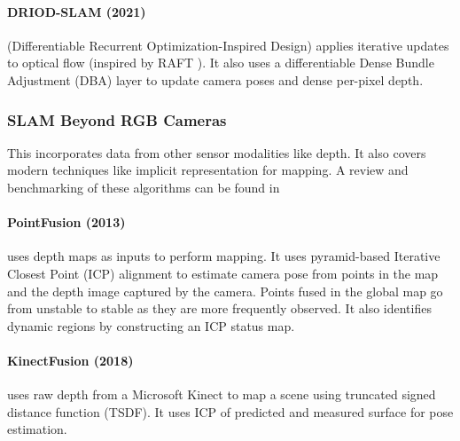 \paragraph{DRIOD-SLAM (2021) \cite{Teed2021DROIDSLAMDV}}
(Differentiable Recurrent Optimization-Inspired Design) applies
iterative updates to optical flow (inspired by RAFT
\cite{Teed2020RAFTRA}). It also uses a differentiable Dense Bundle
Adjustment (DBA) layer to update camera poses and dense per-pixel
depth.


\subsubsection{SLAM Beyond RGB Cameras}

This incorporates data from other sensor modalities like depth. It
also covers modern techniques like implicit representation for
mapping. A review and benchmarking of these algorithms can be found in
\cite{Tosi2024HowNA, Sturm2012ABF}

\paragraph{PointFusion (2013) \cite{Keller2013RealTime3R}} uses depth
maps as inputs to perform mapping. It uses pyramid-based Iterative
Closest Point (ICP) alignment to estimate camera pose from points in
the map and the depth image captured by the camera. Points fused in 
the global map go from unstable to stable as they are more frequently
observed. It also identifies dynamic regions by constructing an ICP
status map.

\paragraph{KinectFusion (2018) \cite{Newcombe2011KinectFusionRD}} uses
raw depth from a Microsoft Kinect to map a scene using truncated
signed distance function (TSDF). It uses ICP of predicted and measured
surface for pose estimation.

